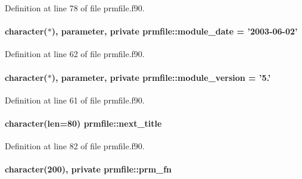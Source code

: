 Definition at line 78 of file prmfile.\-f90.

\hypertarget{classprmfile_a48183bde1cdabac9409dc02743832bc9}{
\paragraph[{module\-\_\-date}]{\setlength{\rightskip}{0pt plus 5cm}character($\ast$), parameter, private prmfile\-::module\-\_\-date = '2003-\/06-\/02'\hspace{0.3cm}{\ttfamily [private]}}}\label{classprmfile_a48183bde1cdabac9409dc02743832bc9}


Definition at line 62 of file prmfile.\-f90.

\hypertarget{classprmfile_ad1fe8cf73b3f3f94fd00ae2859c7c74f}{
\paragraph[{module\-\_\-version}]{\setlength{\rightskip}{0pt plus 5cm}character($\ast$), parameter, private prmfile\-::module\-\_\-version = '5.'\hspace{0.3cm}{\ttfamily [private]}}}\label{classprmfile_ad1fe8cf73b3f3f94fd00ae2859c7c74f}


Definition at line 61 of file prmfile.\-f90.

\hypertarget{classprmfile_a2b445359c65093bfa9db2cd3a999a1d5}{
\paragraph[{next\-\_\-title}]{\setlength{\rightskip}{0pt plus 5cm}character(len=80) prmfile\-::next\-\_\-title}}\label{classprmfile_a2b445359c65093bfa9db2cd3a999a1d5}


Definition at line 82 of file prmfile.\-f90.

\hypertarget{classprmfile_a7fa4dba8d220f72af1bc184a420a66b6}{
\paragraph[{prm\-\_\-fn}]{\setlength{\rightskip}{0pt plus 5cm}character(200), private prmfile\-::prm\-\_\-fn\hspace{0.3cm}{\ttfamily [private]}}}\label{classprmfile_a7fa4dba8d220f72af1bc184a420a66b6}


